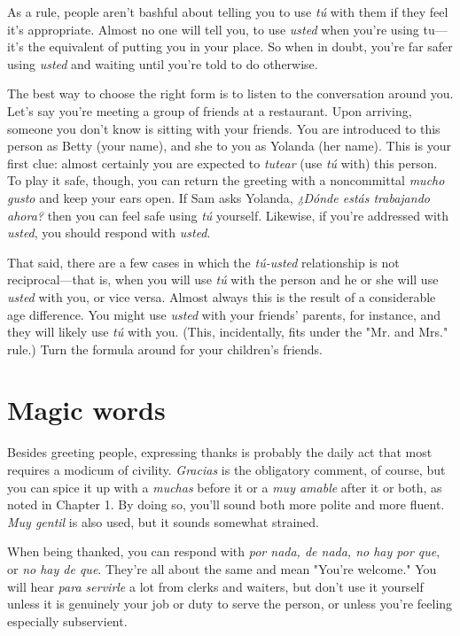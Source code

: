 \documentclass[14pt,a4paper,oneside]{memoir}
\begin{document}
As a rule, people aren't bashful about telling you to use \emph{tú}
with them if they feel it's appropriate. Almost no one will tell you, to
use \emph{usted} when you're using tu---it's the equivalent of putting you in
your place. So when in doubt, you're far safer using \emph{usted} and waiting
until you're told to do otherwise.

The best way to choose the right form is to listen to the conversation around you. Let's say you're meeting a group of friends at a
restaurant. Upon arriving, someone you don't know is sitting with
your friends. You are introduced to this person as Betty (your name),
and she to you as Yolanda (her name). This is your first clue: almost
certainly you are expected to \emph{tutear} (use \emph{tú} with) this person. To play
it safe, though, you can return the greeting with a noncommittal \emph{mucho gusto} and keep your ears open. If Sam asks Yolanda, \emph{¿Dónde estás
trabajando ahora?} then you can feel safe using \emph{tú} yourself. Likewise, if
you're addressed with \emph{usted}, you should respond with \emph{usted}.

That said, there are a few cases in which the \emph{tú-usted} relationship is not reciprocal---that is, when you will use \emph{tú} with the person
and he or she will use \emph{usted} with you, or vice versa. Almost always
this is the result of a considerable age difference. You might use \emph{usted}
with your friends' parents, for instance, and they will likely use \emph{tú}
with you. (This, incidentally, fits under the "Mr. and Mrs." rule.) Turn
the formula around for your children's friends.

\section{Magic words}

Besides greeting people, expressing thanks is probably the
daily act that most requires a modicum of civility. \emph{Gracias} is the
obligatory comment, of course, but you can spice it up with a \emph{muchas}
before it or a \emph{muy amable} after it or both, as noted in Chapter 1. By
doing so, you'll sound both more polite and more fluent. \emph{Muy gentil} is
also used, but it sounds somewhat strained.

When being thanked, you can respond with \emph{por nada, de
nada, no hay por que}, or \emph{no hay de que}. They're all about the same
and mean "You're welcome." You will hear \emph{para servirle} a lot from
clerks and waiters, but don't use it yourself unless it is genuinely
your job or duty to serve the person, or unless you're feeling especially subservient.
\end{document}
